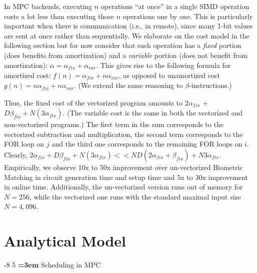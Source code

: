 \documentclass[sigconf, screen, natbib=false, dvipsnames, table]{acmart}
\makeatletter
\renewcommand{\subsection}{\@startsection{subsection}{2}{\z@}%
                        {-8\p@ \@plus -4\p@ \@minus -4\p@}%
                        {5\p@ \@plus 2\p@ \@minus 2\p@}%
                        {\normalfont\Large\bfseries\boldmath
                         \rightskip=\z@ \@plus 3em\pretolerance=10000 }}
\theoremstyle{definition}
\makeatother
\begin{document}
In MPC backends, executing $n$ operations ``at once'' in a single SIMD operation costs a lot less than executing those $n$ operations one by one.
This is particularly important when there is communication (i.e., in remote), since many 1-bit values are sent at once rather than sequentially. 
We elaborate on the cost model in the following section but for now consider that 
each operation has a \emph{fixed} portion (does benefits from amortization) and 
a \emph{variable} portion (does not benefit from amortization): $\alpha = \alpha_\mathit{fix} + \alpha_\mathit{var}$. 
This gives rise to the following formula for amortized cost: $f(n) = \alpha_\mathit{fix} + n\alpha_\mathit{var}$, 
as opposed to unamortized cost $g(n) = n\alpha_\mathit{fix} + n\alpha_\mathit{var}$. (We extend the same reasoning to 
$\beta$-instructions.)

Thus, the fixed cost of the vectorized program amounts to
$2\alpha_\mathit{fix}$ + $D \beta_\mathit{fix} + N(3\alpha_\mathit{fix})$. (The variable cost is the same in both the vectorized and non-vectorized programs.) 
The first term in the sum corresponds to the vectorized
subtraction and multiplication, the second term corresponds to the FOR loop on $j$ and the third 
one corresponds to the remaining FOR loops on $i$. Clearly, $2\alpha_\mathit{fix} + D\beta_\mathit{fix} + N(3\alpha_\mathit{fix}) << ND(2\alpha_\mathit{fix}+\beta_\mathit{fix}) + N3\alpha_\mathit{fix}$.
Empirically, we observe 10x to 50x improvement over un-vectorized Biometric Matching in circuit generation time and setup time and 5x to 30x improvement in online time.
Additionally, the un-vectorized version runs out of memory for $N=256$, while the vectorized one runs with the standard maximal input size $N=4,096$.


\section{Analytical Model}
\label{sec:model}


\subsection{Scheduling in MPC}
\label{sec:mpc}

\end{document}
